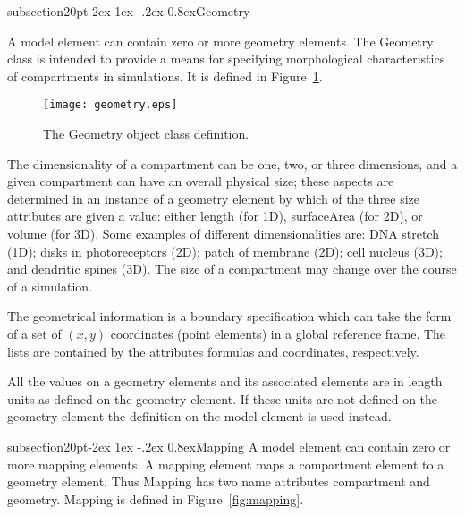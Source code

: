 \documentclass[10pt]{article}
\makeatletter
\renewcommand{\subsection}{\@startsection%
  {subsection}{2}{0pt}{-2ex \@plus 1ex \@minus -.2ex}%
  {0.8ex}{\slshape\large\bfseries}}
\newcommand{\class}[1]{\textsf{#1}}
\newcommand{\attrib}[1]{\textsf{#1}}
\makeatother
\begin{document}
\subsection{Geometry}

A \class{model} element can contain zero or more \class{geometry}
elements. The \class{Geometry} class is intended to provide a
means for specifying morphological characteristics of
compartments in simulations.  It is defined in
Figure~\ref{fig:geometry}.

\begin{figure}[h]
  \centering
  \texttt{[image: geometry.eps]}
  \caption{The \class{Geometry} object class definition.}
  \label{fig:geometry}
\end{figure}

The dimensionality of a compartment can be one, two, or three
dimensions, and a given compartment can have an overall physical
size; these aspects are determined in an instance of a
\class{geometry} element by which of the three size attributes are
given a value: either \attrib{length} (for 1D),
\attrib{surfaceArea} (for 2D), or \attrib{volume} (for 3D).  Some
examples of different dimensionalities are: DNA stretch (1D);
disks in photoreceptors (2D); patch of membrane (2D); cell
nucleus (3D); and dendritic spines (3D).  The size of a
compartment may change over the course of a simulation.

The geometrical information is a boundary specification which can
take the form of a set of $(x,y)$ coordinates (\class{point}
elements) in a global reference frame.  The lists are contained
by the attributes \attrib{formulas} and \attrib{coordinates},
respectively.

All the values on a \class{geometry} elements and its associated
elements are in length units as defined on the \class{geometry}
element.  If these units are not defined on the \class{geometry}
element the definition on the \class{model} element is used
instead.

\subsection{Mapping}
A \class{model} element can contain zero or more \class{mapping}
elements.  A \class{mapping} element maps a \class{compartment}
element to a \class{geometry} element.  Thus \class{Mapping} has
two name attributes \attrib{compartment} and \attrib{geometry}.
\class{Mapping} is defined in Figure~\ref{fig:mapping}.
\end{document}
